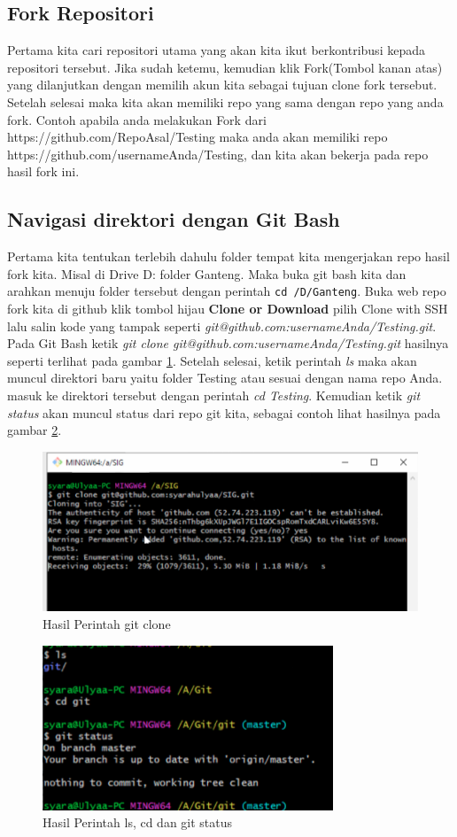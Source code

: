 \subsection{Fork Repositori}
Pertama kita cari repositori utama yang akan kita ikut berkontribusi kepada repositori tersebut. Jika sudah ketemu, kemudian klik Fork(Tombol kanan atas) yang dilanjutkan dengan memilih akun kita sebagai tujuan clone fork tersebut. Setelah selesai maka kita akan memiliki repo yang sama dengan repo yang anda fork. Contoh apabila anda melakukan Fork dari https://github.com/RepoAsal/Testing maka anda akan memiliki repo https://github.com/usernameAnda/Testing, dan kita akan bekerja pada repo hasil fork ini.


\subsection{Navigasi direktori dengan Git Bash}
Pertama kita tentukan terlebih dahulu folder tempat kita mengerjakan repo hasil fork kita. Misal di Drive D: folder Ganteng. Maka buka git bash kita dan arahkan menuju folder tersebut dengan perintah 
\verb|cd /D/Ganteng|.
Buka web repo fork kita di github klik tombol hijau \textbf{Clone or Download} pilih Clone with SSH lalu salin kode yang tampak seperti \textit{git@github.com:usernameAnda/Testing.git}. Pada Git Bash ketik \textit{git clone git@github.com:usernameAnda/Testing.git} hasilnya seperti terlihat pada gambar \ref{gitclone}. Setelah selesai, ketik perintah \textit{ls} maka akan muncul direktori baru yaitu folder Testing atau sesuai dengan nama repo Anda. masuk ke direktori tersebut dengan perintah \textit{cd Testing}. Kemudian ketik \textit{git status} akan muncul status dari repo git kita, sebagai contoh lihat hasilnya pada gambar \ref{lscdstatus}.
\begin{figure}[!htbp]
\centerline{\includegraphics[width=.75\textwidth]{Figures/gitclone}}
\caption{Hasil Perintah git clone}
\label{gitclone}
\end{figure}
\begin{figure}[!htbp]
\centerline{\includegraphics[width=.75\textwidth]{Figures/lscdstatus}}
\caption{Hasil Perintah ls, cd dan git status}
\label{lscdstatus}
\end{figure}

